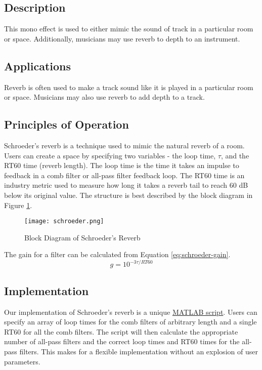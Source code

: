 \subsection{Description}
This mono effect is used to either mimic the sound of track in a particular room or space. Additionally, musicians may use reverb to depth to an instrument.

\subsection{Applications}
Reverb is often used to make a track sound like it is played in a particular room or space. Musicians may also use reverb to add depth to a track.

\subsection{Principles of Operation}
Schroeder's reverb is a technique used to mimic the natural reverb of a room. Users can create a space by specifying two variables - the loop time, $\tau$, and the RT60 time (reverb length). The loop time is the time it takes an impulse to feedback in a comb filter or all-pass filter feedback loop. The RT60 time is an industry metric used to measure how long it takes a reverb tail to reach 60 dB below its original value. The structure is best described by the block diagram in Figure \ref{fig:schroeder-block-diagram}.
\begin{figure}[ht]
    \centering
    \texttt{[image: schroeder.png]}
    \caption{Block Diagram of Schroeder's Reverb}
    \label{fig:schroeder-block-diagram}
\end{figure}
The gain for a filter can be calculated from Equation \ref{eq:schroeder-gain}.
\begin{equation}
    g = 10^{-3 \tau / RT60}
    \label{eq:schroeder-gain}
\end{equation}

\subsection{Implementation}
Our implementation of Schroeder's reverb is a unique \href{run:../schroeder.m}{MATLAB script}. Users can specify an array of loop times for the comb filters of arbitrary length and a single RT60 for all the comb filters. The script will then calculate the appropriate number of all-pass filters and the correct loop times and RT60 times for the all-pass filters. This makes for a flexible implementation without an explosion of user parameters.

